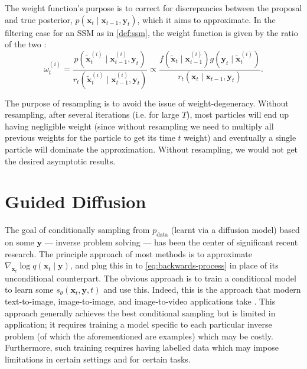 \begin{remark}
    The weight function's purpose is to correct for discrepancies between the proposal and true
    posterior, $p(\mathbf{x}_t \mid \mathbf{x}_{t-1}, \mathbf{y}_t)$, which it aims to approximate. In the
    filtering case for an SSM as in \autoref{def:ssm}, the weight function is given by the ratio of the
    two \parencite{chopinIntroductionSequentialMonte2020}:
    \begin{equation}
        \omega_t^{(i)} = \frac{p(\tilde{\mathbf{x}}_t^{(i)} \mid \mathbf{x}_{t-1}^{(i)}, \mathbf{y}_t)}{r_t(\tilde{\mathbf{x}}_t^{(i)} \mid \mathbf{x}_{t-1}^{(i)}, \mathbf{y}_{t})}
        \propto \frac{f(\tilde{\mathbf{x}}_t \mid \mathbf{x}_{t-1}^{(i)})g(\mathbf{y}_t \mid \tilde{\mathbf{x}}_t^{(i)})}{r_t(\mathbf{x}_t \mid \mathbf{x}_{t-1}, \mathbf{y}_{t})}. \label{eq:weight-func-gen}
    \end{equation}
\end{remark}

\begin{remark}[Resampling]
    The purpose of resampling is to avoid the issue of weight-degeneracy. Without resampling,
    after several iterations (i.e. for large $T$), most particles will end up having negligible
    weight (since without resampling we need to multiply all previous weights for the particle to
    get its time $t$ weight) and eventually a single particle will dominate the approximation.
    Without resampling, we would not get the desired asymptotic results.
\end{remark}

\section{Guided Diffusion} \label{sec:related-work}

The goal of conditionally sampling from $p_{\text{data}}$ (learnt via a diffusion model) based on
some $\mathbf{y}$ --- inverse problem solving --- has been the center of significant recent research.
The principle approach of most methods is to approximate
$\nabla_{\mathbf{x}_t}\log q(\mathbf{x}_t \mid \mathbf{y})$, and plug this in to
\autoref{eq:backwards-process} in place of its unconditional counterpart. The obvious approach is
to train a conditional model to learn some $s_{\theta}(\mathbf{x}_t, \mathbf{y}, t)$ and use this.
Indeed, this is the approach that modern text-to-image, image-to-image, and image-to-video
applications take \parencite{nicholGLIDEPhotorealisticImage2021,liDiffusionModelsImage2023,
sahariaPaletteImagetoImageDiffusion2021,sahariaPaletteImagetoImageDiffusion2021,
rombachHighResolutionImageSynthesis2021}. This approach generally achieves the best conditional
sampling but is limited in application; it requires training a model specific to each particular
inverse problem (of which the aforementioned are examples) which may be costly. Furthermore, such
training requires having labelled data which may impose limitations in certain settings and for
certain tasks.

